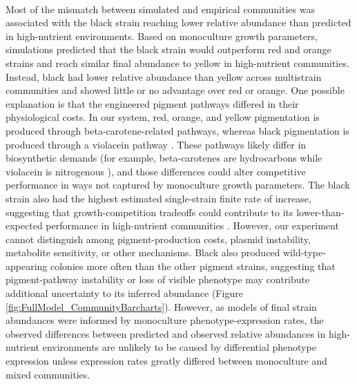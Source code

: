 \paragraph{} Most of the mismatch between simulated and empirical communities was associated with the black strain reaching lower relative abundance than predicted in high-nutrient environments. Based on monoculture growth parameters, simulations predicted that the black strain would outperform red and orange strains and reach similar final abundance to yellow in high-nutrient communities. Instead, black had lower relative abundance than yellow across multistrain communities and showed little or no advantage over red or orange. One possible explanation is that the engineered pigment pathways differed in their physiological costs. In our system, red, orange, and yellow pigmentation is produced through beta-carotene-related pathways, whereas black pigmentation is produced through a violacein pathway \parencite{mitchell2015versatile}. These pathways likely differ in biosynthetic demands (for example, beta-carotenes are hydrocarbons \parencite{maoka2020carotenoids} while violacein is nitrogenous \parencite{choi2015violacein}), and those differences could alter competitive performance in ways not captured by monoculture growth parameters. The black strain also had the highest estimated single-strain finite rate of increase, suggesting that growth-competition tradeoffs could contribute to its lower-than-expected performance in high-nutrient communities \parencite{kurihara1990trade}. However, our experiment cannot distinguish among pigment-production costs, plasmid instability, metabolite sensitivity, or other mechanisms. Black also produced wild-type-appearing colonies more often than the other pigment strains, suggesting that pigment-pathway instability or loss of visible phenotype may contribute additional uncertainty to its inferred 
abundance (Figure \ref{fig:FullModel_CommunityBarcharts}). However, as models of final strain abundances were informed by monoculture phenotype-expression rates, the observed differences between predicted and observed relative abundances in high-nutrient environments are unlikely to be caused by differential phenotype expression unless expression rates greatly differed between monoculture and mixed communities.

